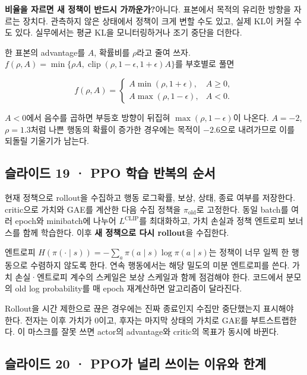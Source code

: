 \documentclass[11pt,a4paper]{article}
\begin{document}
\par\medskip\noindent\textbf{비율을 자르면 새 정책이 반드시 가까운가?}\quad 아니다. 표본에서 목적의 유리한 방향을 자르는 장치다. 관측하지 않은 상태에서 정책이 크게 변할 수도 있고, 실제 KL이 커질 수도 있다. 실무에서는 평균 KL을 모니터링하거나 조기 중단을 더한다.\par

한 표본의 advantage를 $A$, 확률비를 $\rho$라고 줄여 쓰자. $f(\rho,A)=\min\{\rho A,\operatorname{clip}(\rho,1-\epsilon,1+\epsilon)A\}$를 부호별로 풀면\par

\[
f(\rho,A)=
\begin{cases}
A\min(\rho,1+\epsilon),&A\ge0,\\
A\max(\rho,1-\epsilon),&A<0.
\end{cases}
\]

$A<0$에서 음수를 곱하면 부등호 방향이 뒤집혀 $\max(\rho,1-\epsilon)$이 나온다. $A=-2$, $\rho=1.3$처럼 나쁜 행동의 확률이 증가한 경우에는 목적이 $-2.6$으로 내려가므로 이를 되돌릴 기울기가 남는다.\par

\subsection{슬라이드 19 · PPO 학습 반복의 순서}

현재 정책으로 rollout을 수집하고 행동 로그확률, 보상, 상태, 종료 여부를 저장한다. critic으로 가치와 GAE를 계산한 다음 수집 정책을 $\pi_{\mathrm{old}}$로 고정한다. 동일 batch를 여러 epoch와 minibatch에 나누어 $L^{\mathrm{CLIP}}$를 최대화하고, 가치 손실과 정책 엔트로피 보너스를 함께 학습한다. 이후 \textbf{새 정책으로 다시 rollout}을 수집한다.\par

엔트로피 $H(\pi(\cdot\mid s))=-\sum_a\pi(a\mid s)\log\pi(a\mid s)$는 정책이 너무 일찍 한 행동으로 수렴하지 않도록 한다. 연속 행동에서는 해당 밀도의 미분 엔트로피를 쓴다. 가치 손실·엔트로피 계수의 스케일은 보상 스케일과 함께 점검해야 한다. 코드에서 분모의 old log probability를 매 epoch 재계산하면 알고리즘이 달라진다.\par

Rollout을 시간 제한으로 끊은 경우에는 진짜 종료인지 수집만 중단했는지 표시해야 한다. 전자는 이후 가치가 0이고, 후자는 마지막 상태의 가치로 GAE를 부트스트랩한다. 이 마스크를 잘못 쓰면 actor의 advantage와 critic의 목표가 동시에 바뀐다.\par

\subsection{슬라이드 20 · PPO가 널리 쓰이는 이유와 한계}
\end{document}
